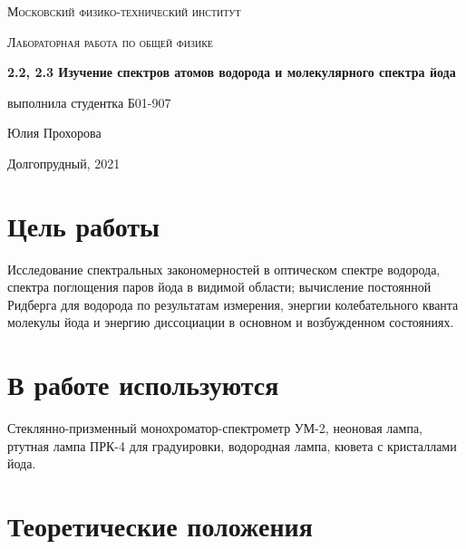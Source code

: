 \documentclass[a4paper]{article}
\begin{document}
\pagestyle{fancy} 
\fancyhead[C]{}
\fancyfoot[C]{ \noindent\rule{\textwidth}{0.4pt} \thepage }

\begin{titlepage}
	\centering
	\vspace{5cm}
    {\scshape\LARGE Московский физико-технический институт\par}
    

	\vspace{3cm}
	{\scshape\Large Лабораторная работа по общей физике \par}
	\vspace{1cm}
    {\huge\bfseries  2.2, 2.3 Изучение спектров атомов водорода и молекулярного спектра йода\par}
	\vspace{1cm}
	\vfill
\begin{flushright}
	{\large выполнила студентка Б01-907}\par
	\vspace{0.3cm}
	{\LARGE Юлия Прохорова}
\end{flushright}

	
	\vfill
Долгопрудный, 2021
\end{titlepage}


\section{Цель работы}
    Исследование спектральных закономерностей в оптическом спектре водорода, спектра поглощения паров йода в видимой области;
    вычисление постоянной Ридберга для водорода по результатам измерения, энергии колебательного кванта молекулы йода и энергию диссоциации в основном и возбужденном состояниях.


\section{В работе используются}
    Стеклянно-призменный монохроматор-спектрометр УМ-2, неоновая лампа, ртутная лампа ПРК-4 для градуировки, водородная лампа, кювета с кристаллами йода.


\section{Теоретические положения}
\end{document}
